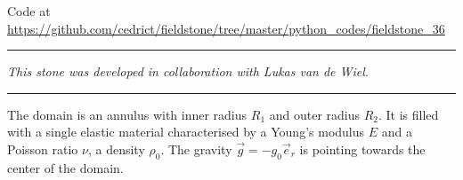 

\begin{center}
Code at \url{https://github.com/cedrict/fieldstone/tree/master/python_codes/fieldstone_36}
\end{center}

\par\noindent\rule{\textwidth}{0.4pt}

{\sl This stone was developed in collaboration with Lukas van de Wiel}.

\par\noindent\rule{\textwidth}{0.4pt}


The domain is an annulus with inner radius $R_1$ and outer radius $R_2$. It is filled with a 
single elastic material characterised by a Young's modulus $E$ and a Poisson ratio $\nu$, a
density $\rho_0$. The gravity ${\vec g}=-g_0 {\vec e}_r$ is pointing towards the center of the domain.

